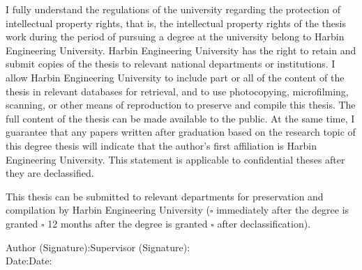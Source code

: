 I fully understand the regulations of the university regarding the protection of intellectual property rights, that is, the intellectual property rights of the thesis work during the period of pursuing a degree at the university belong to Harbin Engineering University. Harbin Engineering University has the right to retain and submit copies of the thesis to relevant national departments or institutions. I allow Harbin Engineering University to include part or all of the content of the thesis in relevant databases for retrieval, and to use photocopying, microfilming, scanning, or other means of reproduction to preserve and compile this thesis. The full content of the thesis can be made available to the public. At the same time, I guarantee that any papers written after graduation based on the research topic of this degree thesis will indicate that the author's first affiliation is Harbin Engineering University. This statement is applicable to confidential theses after they are declassified.

This thesis can be submitted to relevant departments for preservation and compilation by Harbin Engineering University ($\square$ immediately after the degree is granted $\square$ 12 months after the degree is granted $\square$ after declassification).

\vspace{2cm}

\begin{flushright}
Author (Signature):\underline{\makebox[3cm]{}}\qquad Supervisor (Signature):\underline{\makebox[3cm]{}}\\[0.8cm]
Date:\underline{}\qquad Date:\underline{}
\end{flushright}
